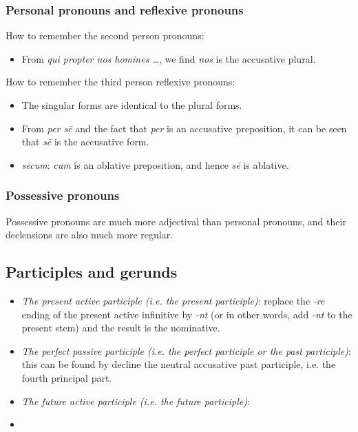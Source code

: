 \documentclass{article}
\newcommand*{\corpus}[1]{\emph{#1}}
\begin{document}
\subsubsection{Personal pronouns and reflexive pronouns}

How to remember the second person pronouns:
\begin{itemize}
    \item From \corpus{qui propter nos homines \dots}, we find \corpus{nos} is the accusative plural.
\end{itemize}

How to remember the third person reflexive pronouns:
\begin{itemize}
    \item The singular forms are identical to the plural forms.
    \item From \corpus{per s\={e}} and the fact that \corpus{per} is an accusative preposition,
    it can be seen that \corpus{s\={e}} is the accusative form. 
    \item \corpus{s\={e}cum}: \corpus{cum} is an ablative preposition, 
    and hence \corpus{s\={e}} is ablative.
\end{itemize}

\subsubsection{Possessive pronouns}

Possessive pronouns are much more adjectival than personal pronouns,
and their declensions are also much more regular.

\subsection{Participles and gerunds}\label{sec:participle-gerund}

\begin{itemize}
    \item \emph{The present active participle (i.e. the present participle)}: 
    replace the \corpus{-re} ending of the present active infinitive by \corpus{-nt}
    (or in other words, add \corpus{-nt} to the present stem)
    and the result is the nominative. %
    \item \emph{The perfect passive participle (i.e. the perfect participle or the past participle)}:
    this can be found by decline the neutral accusative past participle, 
    i.e. the fourth principal part.
    \item \emph{The future active participle (i.e. the future participle)}:
    
    \item \emph{}
\end{itemize}
\end{document}
